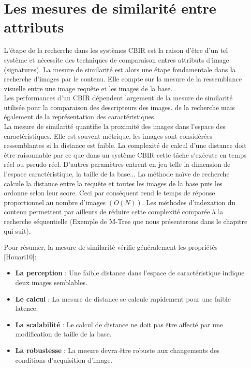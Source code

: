 \section{Les mesures de similarité entre attributs}
L'étape de la recherche dans les systèmes CBIR est la raison d'être d'un tel système et nécessite des techniques de comparaison entres attributs d'image (signatures). La mesure de similarité est alors une étape fondamentale dans la recherche d'images par le contenu. Elle compte sur la mesure de la ressemblance visuelle entre une image requête et les images de la base.\\

Les performances d'un CBIR dépendent largement de la mesure de similarité utilisée pour la comparaison des descripteurs des images.  de la recherche mais également de la représentation des caractéristiques.\\

La mesure de similarité quantifie la proximité des images dans l'espace des caractéristiques. Elle est souvent métrique, les images sont considérées ressemblantes si la distance est faible. La complexité de calcul d'une distance doit être raisonnable par ce que dans un système CBIR cette tâche s'exécute en temps réel ou pseudo réel. D'autres paramètres entrent en jeu telle la dimension de l'espace caractéristique, la taille de la base... La méthode naïve de recherche calcule la distance entre la requête et toutes les images de la base puis les ordonne selon leur score. Ceci par conséquent rend le temps de réponse proportionnel au nombre d'images $ (O(N)) $. Les méthodes d'indexation du contenu permettent par ailleurs de réduire cette complexité comparée à la recherche séquentielle (Exemple de M-Tree que nous présenterons dans le chapitre qui suit). 

Pour résumer, la mesure de similarité vérifie généralement les propriétés [Houari10]:

\begin{itemize}
	\item  \textbf{La perception} : Une faible distance dans l'espace de caractéristique indique deux images semblables.
	
	\item \textbf{Le calcul} : La mesure de distance se calcule rapidement pour une faible latence.
	
	\item \textbf{La scalabilité }: Le calcul de distance ne doit pas être affecté par une modification de taille de la base.
	
	\item \textbf{La robustesse} : La mesure devra être robuste aux changements des conditions d'acquisition d'image.
\end{itemize}

